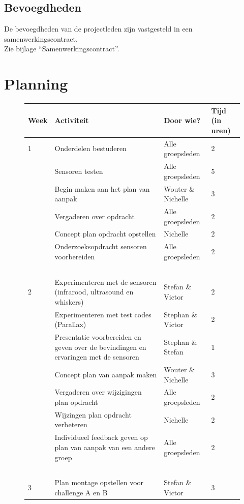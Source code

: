 \documentclass[oneside]{book}
\begin{document}
\section*{Bevoegdheden}
De bevoegdheden van de projectleden zijn vastgesteld in een samenwerkingscontract.\\
Zie bijlage “Samenwerkingscontract”.
\clearpage
\chapter{Planning}
{\color{red}
\begin{figure}[H]\begin{adjustwidth}{-4.25cm}{}
\begin{tabular}{ | l | l | l | l | }
\hline
	Week & Activiteit & Door wie? & Tijd (in uren) \\ \hline
	1 & Onderdelen bestuderen & Alle groepsleden & 2 \\ \hline
	 & Sensoren testen & Alle groepsleden & 5 \\ \hline
	 & Begin maken aan het plan van aanpak & Wouter \& Nichelle & 3 \\ \hline
	 & Vergaderen over opdracht & Alle groepsleden & 2 \\ \hline
	 & Concept plan opdracht opstellen & Nichelle & 2 \\ \hline
	 & Onderzoeksopdracht sensoren voorbereiden & Alle groepsleden & 2 \\ \hline
	 & \  & \  & \  \\ \hline
	2 & Experimenteren met de sensoren (infrarood, ultrasound en whiskers) & Stefan \& Victor & 2 \\ \hline
	 & Experimenteren met test codes (Parallax) & Stephan \& Victor & 2 \\ \hline
	 & Presentatie voorbereiden en geven over de bevindingen en ervaringen met de sensoren & Stephan \& Stefan & 1 \\ \hline
	 & Concept plan van aanpak maken & Wouter \& Nichelle & 3 \\ \hline
	 & Vergaderen over wijzigingen plan opdracht & Alle groepsleden & 2 \\ \hline
	 & Wijzingen plan opdracht verbeteren & Nichelle & 2 \\ \hline
	 & Individueel feedback geven op plan van aanpak van een andere groep & Alle groepsleden & 2 \\ \hline
	 & \  & \  & \  \\ \hline
	3 & Plan montage opstellen voor challenge A en B & Stefan \& Victor & 3 \\ \hline

\end{tabular}
\end{adjustwidth}
\end{figure}}
\end{document}

